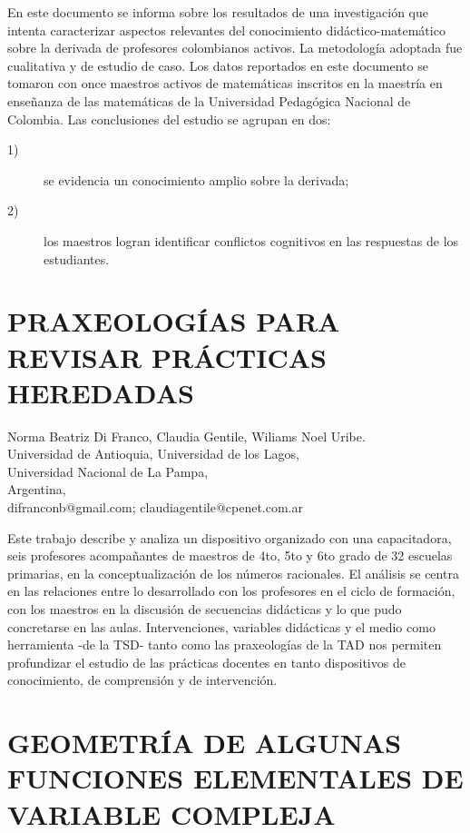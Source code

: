 En este documento se informa sobre los resultados de una investigación
que intenta caracterizar aspectos relevantes del conocimiento didáctico-matemático
sobre la derivada de profesores colombianos activos. La metodología
adoptada fue cualitativa y de estudio de caso. Los datos reportados
en este documento se tomaron con once maestros activos de matemáticas
inscritos en la maestría en enseñanza de las matemáticas de la Universidad
Pedagógica Nacional de Colombia. Las conclusiones del estudio se agrupan
en dos: 
\begin{description}
\item [{1)}] se evidencia un conocimiento amplio sobre la derivada;
\item [{2)}] los maestros logran identificar conflictos cognitivos en las
respuestas de los estudiantes.
\end{description}

\section{PRAXEOLOGÍAS PARA REVISAR PRÁCTICAS HEREDADAS}

\begin{datos}
Norma Beatriz Di Franco, Claudia Gentile,   Wiliams Noel Uribe.\\
Universidad de Antioquia, Universidad de los Lagos,\\
Universidad Nacional de La Pampa,\\
\hfill Argentina, \\
\hfill difranconb@gmail.com; claudiagentile@cpenet.com.ar
\end{datos}

Este trabajo describe y analiza un dispositivo organizado con una
capacitadora, seis profesores acompañantes de maestros de 4to, 5to
y 6to grado de 32 escuelas primarias, en la conceptualización de los
números racionales. El análisis se centra en las relaciones entre
lo desarrollado con los profesores en el ciclo de formación, con los
maestros en la discusión de secuencias didácticas y lo que pudo concretarse
en las aulas. Intervenciones, variables didácticas y el medio como
herramienta -de la TSD- tanto como las praxeologías de la TAD nos
permiten profundizar el estudio de las prácticas docentes en tanto
dispositivos de conocimiento, de comprensión y de intervención.


\section{GEOMETRÍA DE ALGUNAS FUNCIONES ELEMENTALES DE VARIABLE COMPLEJA }

